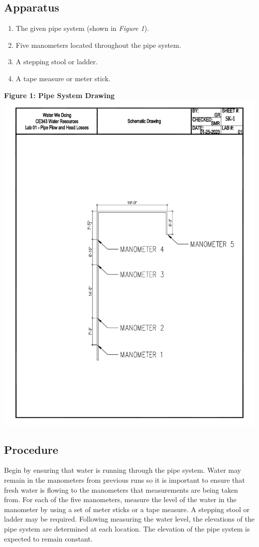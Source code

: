 \documentclass{article}
\begin{document}
\subsection{Apparatus}
\begin{enumerate}
    \item The given pipe system (shown in \emph{Figure 1}).
    \item Five manometers located throughout the pipe system.
    \item A stepping stool or ladder.
    \item A tape measure or meter stick. 

\end{enumerate}
\begin{center}
    {\large{\bf Figure 1: Pipe System Drawing\\}}
    \includegraphics*[scale=0.55]{dwg.pdf}
\end{center}
\subsection{Procedure}
\par Begin by ensuring that water is running through the pipe system. Water may remain in the manometers from previous runs so it is important to ensure that fresh water is flowing to the manometers that measurements are being taken from. For each of the five manometers, measure the level of the water in the manometer by using a set of meter sticks or a tape measure. A stepping stool or ladder may be required. Following measuring the water level, the elevations of the pipe system are determined at each location. The elevation of the pipe system is expected to remain constant.  
\newpage
\end{document}
